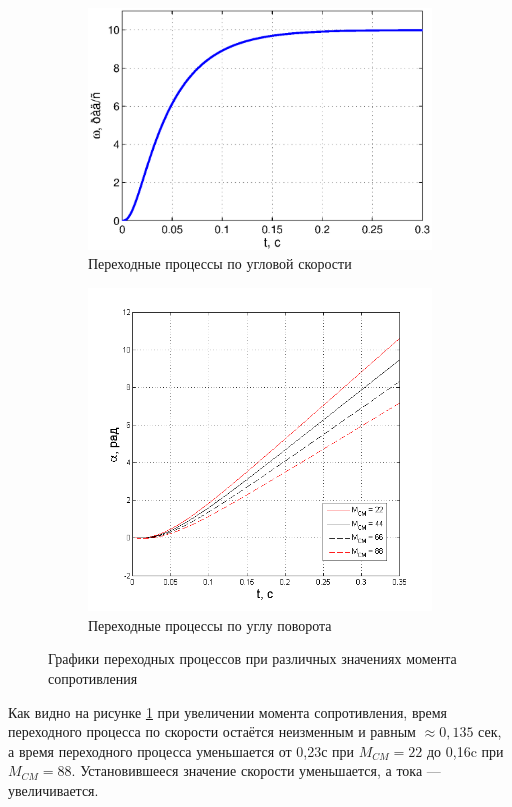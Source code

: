 \documentclass[fleqn, a4paper, 11pt, russian]{article}
\begin{document}
	\begin{figure}[ht!]\ContinuedFloat
		\centering
		\begin{subfigure}[b]{0.49\textwidth}
			\includegraphics[width = \textwidth]{epsTest/uglskor}
			\caption{Переходные процессы по угловой скорости}
		\end{subfigure}
		\hfill
		\begin{subfigure}[b]{0.49\textwidth}
			\includegraphics[width = \textwidth]{Mvar/MvarAlpha}
			\caption{Переходные процессы по углу поворота}
		\end{subfigure}
		\caption{Графики переходных процессов при различных значениях момента сопротивления}
		\label{MVar}
	\end{figure}
	Как видно на рисунке \ref{MVar} при увеличении момента сопротивления, время переходного процесса по скорости остаётся неизменным и равным $\approx0,135$ сек, а время переходного процесса уменьшается от 0,23с при $M_{CM} = 22$ до 0,16c при $M_{CM} = 88.$ Установившееся значение скорости уменьшается, а тока --- увеличивается.
	\clearpage
\end{document}
